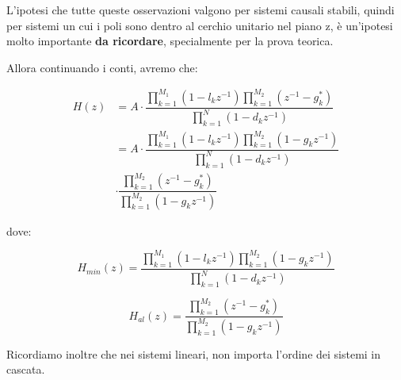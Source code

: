 \begin{tcolorbox}
    L'ipotesi che tutte queste osservazioni valgono per sistemi causali stabili, quindi per sistemi un cui i poli sono dentro al cerchio unitario nel piano z, 
    è un'ipotesi molto importante \textbf{da ricordare}, specialmente per la prova teorica. 
\end{tcolorbox}

Allora continuando i conti, avremo che: 

{
    \Large 
    \begin{equation}
        \begin{split}
            H \left(z\right) 
            &=
            A \cdot 
            \dfrac{
                \prod_{k = 1}^{M_1} \left(1 - l_k z^{-1}\right) 
                \prod_{k = 1}^{M_2} \left(z^{-1} - g_k^{*}\right)
            }{\prod_{k = 1}^{N} \left(1 - d_k z^{-1}\right)}
            \\
            &= 
            A \cdot 
            \dfrac{
                \prod_{k = 1}^{M_1} \left(1 - l_k z^{-1}\right) 
                \prod_{k = 1}^{M_2} \left(1 - g_k z^{-1}\right)
            }{\prod_{k = 1}^{N} \left(1 - d_k z^{-1}\right)} 
            \\
            &\cdot 
            \dfrac{\prod_{k = 1}^{M_2} \left(z^{-1} - g_k^{*}\right)}{\prod_{k = 1}^{M_2} \left(1 - g_k z^{-1} \right)}
        \end{split}
    \end{equation}
}

\newpage 

dove: 

{
    \Large 
    \begin{equation}
        H_{min} \left(z\right)
        = 
        \dfrac{
                \prod_{k = 1}^{M_1} \left(1 - l_k z^{-1}\right) 
                \prod_{k = 1}^{M_2} \left(1 - g_k z^{-1}\right)
            }{\prod_{k = 1}^{N} \left(1 - d_k z^{-1}\right)} 
    \end{equation}
}

{
    \Large 
    \begin{equation}
        H_{al} \left(z\right)
        = 
        \dfrac{\prod_{k = 1}^{M_2} \left(z^{-1} - g_k^{*}\right)}{\prod_{k = 1}^{M_2} \left(1 - g_k z^{-1} \right)}
    \end{equation}
}

\begin{tcolorbox}
    Ricordiamo inoltre che nei sistemi lineari, non importa l'ordine dei sistemi in cascata. 
\end{tcolorbox}


